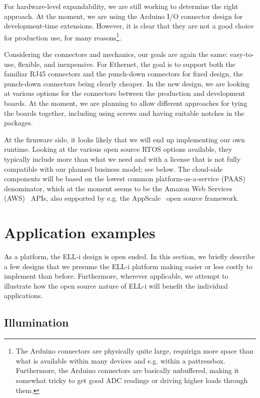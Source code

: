\documentclass[draft,a4paper]{siamltex}
\begin{document}
For hardware-level expandability, we are still working to determine
the right approach.  At the moment, we are using the Arduino I/O
connector design for development-time extensions.  However, it is
clear that they are not a good choice for production use, for many
reasons\footnote{The Arduino connectors are physically quite large,
  requirign more space than what is available within many devices and
  e.g. within a pattressbox.  Furthermore, the Arduino connectors are
  basically unbuffered, making it somewhat tricky to get good ADC
  readings or driving higher loads through them.}.

Considering the connectors and mechanics, our goals are again the
same: easy-to-use, flexible, and inexpensive.  For Ethernet, the goal
is to support both the familiar RJ45 connectors and the punch-down
connectors for fixed design, the punch-down connectors being clearly
cheaper.  In the new design, we are looking at various options for the
connectors between the production and development boards.  At the
moment, we are planning to allow different approaches for tying the
boards together, including using screws and having suitable notches in
the packages.

At the firmware side, it looks likely that we will end up implementing
our own runtime.  Looking at the various open source RTOS options
available, they typically include more than what we need and with a
license that is not fully compatible with our planned business model;
see below.  The cloud-side components will be based on the lowest
common platform-as-a-service (PAAS) denominator, which at the moment
seems to be the Amazon Web Services (AWS)~\cite{AWS} APIs, also supported by
e.g. the AppScale~\cite{AppScale} open source framework.


\section{Application examples}
\label{sec:examples}

As a platform, the ELL-i design is open ended.  In this section, we
briefly describe a few designs that we presume the ELL-i platform
making easier or less costly to implement than before.  Furthermore,
wherever applicable, we attempt to illustrate how the open source
nature of ELL-i will benefit the individual applications.

\subsection{Illumination}
\end{document}
